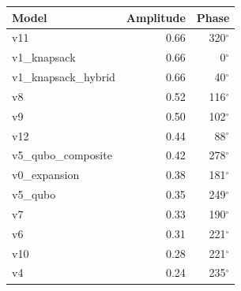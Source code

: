 \begin{tabular}{lrr}
\toprule
Model & Amplitude & Phase \\
\midrule
v11 & 0.66 & 320$^\circ$ \\
v1\_knapsack & 0.66 & 0$^\circ$ \\
v1\_knapsack\_hybrid & 0.66 & 40$^\circ$ \\
v8 & 0.52 & 116$^\circ$ \\
v9 & 0.50 & 102$^\circ$ \\
v12 & 0.44 & 88$^\circ$ \\
v5\_qubo\_composite & 0.42 & 278$^\circ$ \\
v0\_expansion & 0.38 & 181$^\circ$ \\
v5\_qubo & 0.35 & 249$^\circ$ \\
v7 & 0.33 & 190$^\circ$ \\
v6 & 0.31 & 221$^\circ$ \\
v10 & 0.28 & 221$^\circ$ \\
v4 & 0.24 & 235$^\circ$ \\
\bottomrule
\end{tabular}
